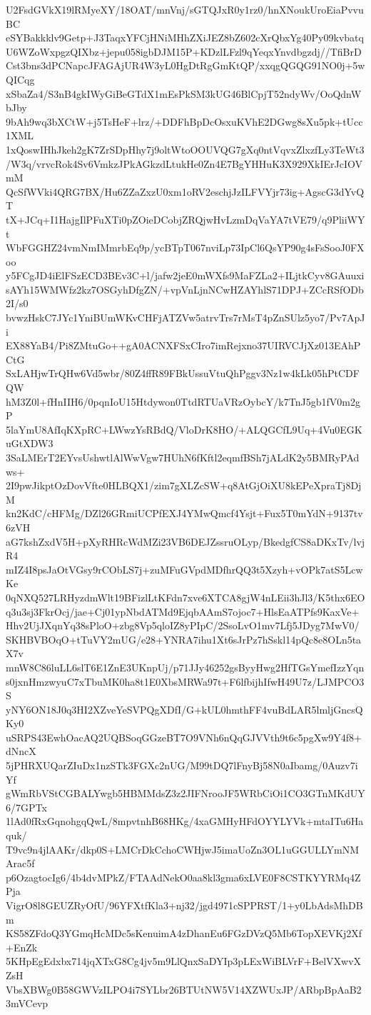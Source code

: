 U2FsdGVkX19lRMyeXY/18OAT/mnVnj/sGTQJxR0y1rz0/hnXNoukUroEiaPvvuBC
eSYBakkklv9Getp+J3TaqxYFCjHNiMHhZXiJEZ8bZ602cXrQbxYg40Py09kvbatq
U6WZoWxpgzQIXbz+jepu058igbDJM15P+KDzlLFzl9qYeqxYnvdbgzdj//TfiBrD
Cst3bns3dPCNapcJFAGAjUR4W3yL0HgDtRgGmKtQP/xxqgQGQG91NO0j+5wQICqg
xSbaZa4/S3nB4gkIWyGiBeGTdX1mEsPkSM3kUG46BlCpjT52ndyWv/OoQdnWbJby
9bAh9wq3bXCtW+j5TsHeF+lrz/+DDFhBpDcOsxuKVhE2DGwg8sXu5pk+tUcc1XML
1xQoswIHhJkeh2gK7ZrSDpHhy7j9oltWtoOOUVQG7gXq0ntVqvxZlxzfLy3TeWt3
/W3q/vrvcRok4Sv6VmkzJPkAGkzdLtukHe0Zn4E7BgYHHuK3X929XkIErJcIOVmM
QcSfWVki4QRG7BX/Hu6ZZaZxzU0xm1oRV2eschjJzILFVYjr73ig+AgscG3dYvQT
tX+JCq+I1HajgIlPFuXTi0pZOieDCobjZRQjwHvLzmDqVaYA7tVE79/q9PliiWYt
WbFGGHZ24vmNmIMmrbEq9p/ycBTpT067nviLp73IpCl6QsYP90g4sFsSooJ0FXoo
y5FCgJD4iElFSzECD3BEv3C+l/jafw2jeE0mWXfs9MaFZLa2+ILjtkCyv8GAuuxi
sAYh15WMWfz2kz7OSGyhDfgZN/+vpVnLjnNCwHZAYhlS71DPJ+ZCcRSfODb2I/s0
bvwzHskC7JYc1YniBUmWKvCHFjATZVw5atrvTrs7rMsT4pZnSUlz5yo7/Pv7ApJi
EX88YaB4/Pi8ZMtuGo++gA0ACNXFSxCIro7imRejxno37UIRVCJjXz013EAhPCtG
SxLAHjwTrQHw6Vd5wbr/80Z4ffR89FBkUssuVtuQhPggv3Nz1w4kLk05hPtCDFQW
hM3Z0l+fHnIIH6/0pqnIoU15Htdywon0TtdRTUaVRzOybcY/k7TnJ5gb1fV0m2gP
5laYmU8AfIqKXpRC+LWwzYsRBdQ/VloDrK8HO/+ALQGCfL9Uq+4Vu0EGKuGtXDW3
3SaLMErT2EYvsUshwtlAlWwVgw7HUhN6fKftl2eqmfBSh7jALdK2y5BMRyPAdws+
2I9pwJikptOzDovVfte0HLBQX1/zim7gXLZcSW+q8AtGjOiXU8kEPeXpraTj8DjM
kn2KdC/cHFMg/DZl26GRmiUCPfEXJ4YMwQmcf4Ysjt+Fux5T0mYdN+9137tv6zVH
aG7kshZxdV5H+pXyRHRcWdMZi23VB6DEJZssruOLyp/BkedgfCS8aDKxTv/lvjR4
mIZ4I8psJaOtVGsy9rCObLS7j+zuMFuGVpdMDfhrQQ3t5Xzyh+vOPk7atS5LcwKe
0qNXQ527LRHyzdmWlt19BFizlLtKFdn7xve6XTCA8gjW4nLEii3hJl3/K5thx6EO
q3u3sj3FkrOcj/jae+Cj01ypNbdATMd9EjqbAAmS7ojoc7+HlsEaATPfs9KaxVe+
Hhv2UjJXqnYq38sPloO+zbg8Vp5qloIZ8yPIpC/2SsoLvO1mv7Lfj5JDyg7MwV0/
SKHBVBOqO+tTuVY2mUG/e28+YNRA7ihu1Xt6sJrPz7hSskl14pQc8e8OLn5taX7v
mnW8C86luLL6slT6E1ZnE3UKnpUj/p71JJy46252gsByyHwg2HfTGsYmefIzzYqn
s0jxnHmzwyuC7xTbuMK0ha8t1E0XbsMRWa97t+F6lfbijhIfwH49U7z/LJMPCO3S
yNY6ON18J0q3HI2XZveYeSVPQgXDfI/G+kUL0hmthFF4vuBdLAR5lmljGncsQKy0
uSRPS43EwhOacAQ2UQBSoqGGzeBT7O9VNh6nQqGJVVth9t6c5pgXw9Y4f8+dNncX
5jPHRXUQarZIuDx1nzSTk3FGXc2nUG/M99tDQ7lFnyBj58N0aIbamg/0Auzv7iYf
gWmRbVStCGBALYwgb5HBMMdsZ3z2JIFNrooJF5WRbCiOi1CO3GTnMKdUY6/7GPTx
1lAd0fRxGqnohgqQwL/8mpvtnhB68HKg/4xaGMHyHFdOYYLYVk+mtaITu6Haquk/
T9vc9n4jlAAKr/dkp0S+LMCrDkCchoCWHjwJ5imaUoZn3OL1uGGULLYmNMArac5f
p6OzagtocIg6/4b4dvMPkZ/FTAAdNekO0aa8kl3gma6xLVE0F8CSTKYYRMq4ZPja
VigrO8l8GEUZRyOfU/96YFXtfKla3+nj32/jgd4971cSPPRST/1+y0LbAdsMhDBm
KS58ZFdoQ3YGmqHcMDc5sKenuimA4zDhanEu6FGzDVzQ5Mb6TopXEVKj2Xf+EnZk
5KHpEgEdxbx714jqXTxG8Cg4jv5m9LlQnxSaDYIp3pLExWiBLVrF+BelVXwvXZsH
VbsXBWg0B58GWVzILPO4i7SYLbr26BTUtNW5V14XZWUxJP/ARbpBpAaB23mVCevp
